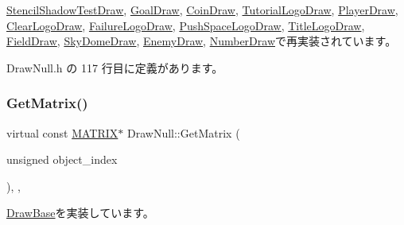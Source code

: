 \mbox{\hyperlink{class_stencil_shadow_test_draw_abfc9caaaa1b6120e2013701a9d264f2d}{Stencil\+Shadow\+Test\+Draw}}, \mbox{\hyperlink{class_goal_draw_a47baf72f8c1c961176610f161069b8d1}{Goal\+Draw}}, \mbox{\hyperlink{class_coin_draw_a869a6b7273b273048dd56822fae4d644}{Coin\+Draw}}, \mbox{\hyperlink{class_tutorial_logo_draw_a3a97860361e32a727246e99052715f37}{Tutorial\+Logo\+Draw}}, \mbox{\hyperlink{class_player_draw_ae818d3adaf5120845c2a78c230b5365e}{Player\+Draw}}, \mbox{\hyperlink{class_clear_logo_draw_ab356bf5d56c10a6689e101b35c30d889}{Clear\+Logo\+Draw}}, \mbox{\hyperlink{class_failure_logo_draw_aaac019fb396a354ef0f823ed2bd72322}{Failure\+Logo\+Draw}}, \mbox{\hyperlink{class_push_space_logo_draw_a0734eed4096afb12e6c9ef1f4d82b9d8}{Push\+Space\+Logo\+Draw}}, \mbox{\hyperlink{class_title_logo_draw_a8858aa1b1eb9a6d4cb4605519efb20eb}{Title\+Logo\+Draw}}, \mbox{\hyperlink{class_field_draw_ab126f938895211ff170bc37045a8e7a2}{Field\+Draw}}, \mbox{\hyperlink{class_sky_dome_draw_acbc487d912b464474ae6f1afd7d6bb74}{Sky\+Dome\+Draw}}, \mbox{\hyperlink{class_enemy_draw_a12f00116f7fa97e07317a949d5c27bb4}{Enemy\+Draw}}, \mbox{\hyperlink{class_number_draw_a3348d9d1cdd9dd03be25b82069275ca5}{Number\+Draw}}で再実装されています。



 Draw\+Null.\+h の 117 行目に定義があります。

\mbox{\label{class_draw_null_adede079e9c11a756090740b20bb43022}} 
\subsubsection{\texorpdfstring{Get\+Matrix()}{GetMatrix()}}
{\footnotesize\ttfamily virtual const \mbox{\hyperlink{_vector3_d_8h_a032295cd9fb1b711757c90667278e744}{M\+A\+T\+R\+IX}}$\ast$ Draw\+Null\+::\+Get\+Matrix (\begin{DoxyParamCaption}\item[{unsigned}]{object\+\_\+index }\end{DoxyParamCaption})\hspace{0.3cm}{\ttfamily [inline]}, {\ttfamily [override]}, {\ttfamily [virtual]}}



\mbox{\hyperlink{class_draw_base_a01239bf362040f7f2ef5e5f5371dcf18}{Draw\+Base}}を実装しています。



